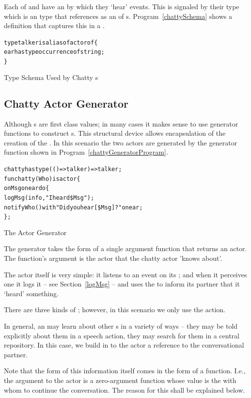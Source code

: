 Each of  and  have an  by which they `hear' events. This is signaled by their type which is an  type that references  as an  of s. Program~\vref{chattySchema} shows a   definition that captures this in a . 
\begin{program}
\begin{alltt}
type talker is alias of actor of \{
  ear has type occurrence of string;
\}
\end{alltt}
\caption{Type Schema Used by Chatty s}
\label{chattySchema}
\end{program}

\subsection{Chatty Actor Generator}
\label{chattyGenerator}
Although s are first class values; in many cases it makes sense to use generator functions to construct s. This structural device allows encapsulation of the creation of the . In this scenario the two actors are generated by the generator function shown in Program~\vref{chattyGeneratorProgram}.
\begin{program}
\begin{alltt}
chatty has type (()=>talker)=>talker;
fun chatty(Who) is actor\{
 on Msg on ear do\{
   logMsg(info,"I heard \$Msg");
   notify Who() with "Did you hear [\$Msg]?" on ear;
\};
\end{alltt}
\caption{The  Actor Generator}
\label{chattyGeneratorProgram}
\end{program}

The  generator takes the form of a single argument function that returns an actor. The function's argument is the actor that the chatty actor 'knows about'.

The  actor itself is very simple: it listens to an event on its ; and when it perceives one it logs it -- see Section~\vref{logMsg} -- and uses the   to inform its partner that it `heard' something. 

There are three kinds of ; however, in this scenario we only use the  action.

\begin{aside}
In general, an  may learn about other s in a variety of ways -- they may be told explicitly about them in a speech action, they may search for them in a central repository. In this case, we build in to the actor a reference to the conversational partner.
\begin{aside}
Note that the form of this information itself comes in the form of a function. I.e., the argument to the  actor is a zero-argument function whose value is the  with whom to continue the conversation. The reason for this shall be explained below.
\end{aside}
\end{aside}

